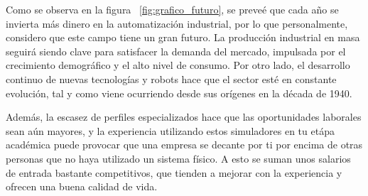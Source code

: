 Como se observa en la figura  ~\ref{fig:grafico_futuro}, se preveé que cada año se invierta más dinero en la automatización industrial,
por lo que personalmente, considero que este campo tiene un gran futuro. La producción industrial en masa seguirá siendo clave para satisfacer la demanda del mercado, impulsada por el crecimiento demográfico y el alto nivel de consumo. Por otro lado, el desarrollo continuo de nuevas tecnologías y robots hace que el sector esté en constante evolución, tal y como viene ocurriendo desde sus orígenes en la década de 1940.

Además, la escasez de perfiles especializados hace que las oportunidades laborales sean aún mayores, y la experiencia utilizando estos simuladores en tu etápa académica puede provocar que una empresa se decante por ti por encima de otras personas que no haya utilizado un sistema físico. A esto se suman unos salarios de entrada bastante competitivos, que tienden a mejorar con la experiencia y ofrecen una buena calidad de vida. 